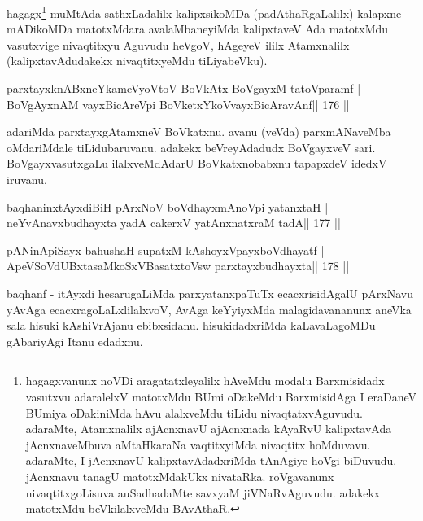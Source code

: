 \begin{artha}
hagagx\footnote[12]{hagagxvanunx noVDi aragatatxleyalilx hAveMdu modalu 
Barxmisidadx vasutxvu adaralelxV matotxMdu BUmi oDakeMdu BarxmisidAga I 
eraDaneV BUmiya oDakiniMda hAvu alalxveMdu tiLidu nivaqtatxvAguvudu. 
adaraMte, Atamxnalilx ajAcnxnavU ajAcnxnada kAyaRvU kalipxtavAda 
jAcnxnaveMbuva aMtaHkaraNa vaqtitxyiMda nivaqtitx hoMduvavu. adaraMte, 
I jAcnxnavU kalipxtavAdadxriMda tAnAgiye hoVgi biDuvudu. jAcnxnavu tanagU matotxMdakUkx nivataRka. roVgavanunx nivaqtitxgoLisuva auSadhadaMte savxyaM jiVNaRvAguvudu. adakekx matotxMdu beVkilalxveMdu BAvAthaR.} muMtAda sathxLadalilx kalipxsikoMDa (padAthaRgaLalilx) kalapxne mADikoMDa matotxMdara avalaMbaneyiMda kalipxtaveV Ada matotxMdu vasutxvige nivaqtitxyu Aguvudu heVgoV, hAgeyeV ililx Atamxnalilx (kalipxtavAdudakekx nivaqtitxyeMdu tiLiyabeVku).
\end{artha}

\begin{shl}
parxtayxknABxneYkameVyoV\s toV BoVkAtx BoVgayxM tatoV\s paramf |
BoVgAyxnAM vayxBicAreV\s pi BoVketxYkoV\s vayxBicAravAnf\hfill || 176 ||
\end{shl}

\begin{artha}
adariMda parxtayxgAtamxneV BoVkatxnu. avanu (veVda) parxmANaveMba  oMdariMdale tiLidubaruvanu. adakekx beVreyAdadudx BoVgayxveV sari. BoVgayxvasutxgaLu ilalxveMdAdarU BoVkatxnobabxnu tapapxdeV idedxV iruvanu.
\end{artha}

\begin{shl}
baqhaninxtAyxdiBiH pArxNoV boVdhayxmAnoV\s pi yatanxtaH |
neYvAnavxbudhayxta yadA cakerxV yatAnxnatxraM tadA\hfill || 177 ||
\end{shl}

\begin{shl}
pANinA\s\s piSayx bahushaH supatxM kAshoyxV\s payxboVdhayatf |
ApeVSoVdUBxtasaMkoSxVBasatxtoV\s sw parxtayxbudhayxta\hfill || 178 ||
\end{shl}

\begin{artha}
baqhanf - itAyxdi hesarugaLiMda parxyatanxpaTuTx ecacxrisidAgalU  pArxNavu yAvAga ecacxragoLaLxlilalxvoV, AvAga keYyiyxMda  malagidavananunx aneVka sala hisuki kAshiVrAjanu ebibxsidanu.  hisukidadxriMda kaLavaLagoMDu gAbariyAgi Itanu edadxnu.
\end{artha}


